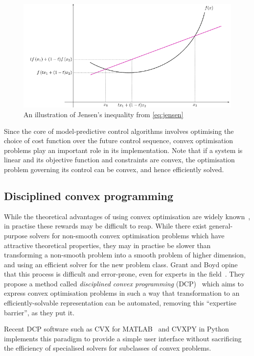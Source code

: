 \begin{figure}
   \centering
   \includegraphics[width=12cm]{images/convexity}
   \caption{An illustration of Jensen's inequality from \autoref{eq:jensen}}
   \label{fig:convexity}
\end{figure}

Since the core of model-predictive control algorithms involves optimising the choice of cost function over the future control sequence, convex optimisation problems play an important role in its implementation.
Note that if a system is linear and its objective function and constraints are convex, the optimisation problem governing its control can be convex, and hence efficiently solved.

\subsection{Disciplined convex programming}

While the theoretical advantages of using convex optimisation are widely known~\cite{Luo06}, in practise these rewards may be difficult to reap.
While there exist general-purpose solvers for non-smooth convex optimisation problems which have attractive theoretical properties, they may in practise be slower than transforming a non-smooth problem into a smooth problem of higher dimension, and using an efficient solver for the new problem class.
Grant and Boyd opine that this process is difficult and error-prone, even for experts in the field~\cite{Grant08}.
They propose a method called \emph{disciplined convex programming} (DCP)~\cite{Grant06} which aims to express convex optimisation problems in such a way that transformation to an efficiently-solvable representation can be automated, removing this ``expertise barrier'', as they put it.

Recent DCP software such as CVX for MATLAB~\cite{CVX} and CVXPY in Python~\cite{CVXPY} implements this paradigm to provide a simple user interface without sacrificing the efficiency of specialised solvers for subclasses of convex problems.
